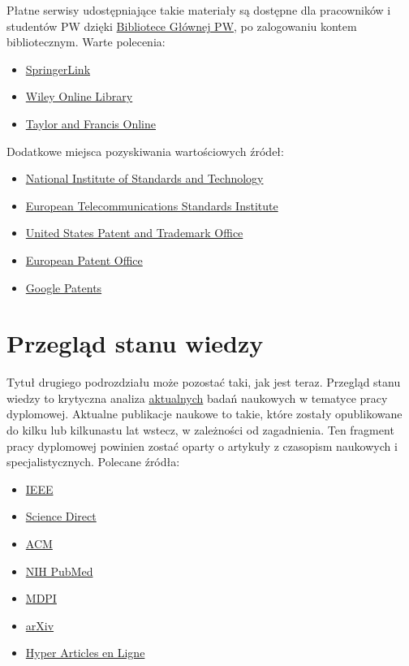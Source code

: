 Płatne serwisy udostępniające takie materiały są dostępne dla pracowników i studentów PW dzięki \href{https://bg.pw.edu.pl/}{Bibliotece Głównej PW}, po zalogowaniu kontem bibliotecznym. Warte polecenia:

\begin{itemize}
	\item \href{http://eczyt.bg.pw.edu.pl/han/SpringerLink}{SpringerLink}
	\item \href{http://eczyt.bg.pw.edu.pl/han/Wiley}{Wiley Online Library}
	\item \href{http://eczyt.bg.pw.edu.pl/han/TaylorandFrancis}{Taylor and Francis Online}
\end{itemize}

Dodatkowe miejsca pozyskiwania wartościowych źródeł:

\begin{itemize}
	\item \href{https://www.nist.gov/}{National Institute of Standards and Technology}
	\item \href{https://www.etsi.org/}{European Telecommunications Standards Institute}
	\item \href{https://www.uspto.gov/}{United States Patent and Trademark Office}
	\item \href{https://www.epo.org/en}{European Patent Office}
	\item \href{https://patents.google.com/}{Google Patents}
\end{itemize}

\section{Przegląd stanu wiedzy}

Tytuł drugiego podrozdziału może pozostać taki, jak jest teraz. Przegląd stanu wiedzy to krytyczna analiza \underline{aktualnych} badań naukowych w tematyce pracy dyplomowej. Aktualne publikacje naukowe to takie, które zostały opublikowane do kilku lub kilkunastu lat wstecz, w zależności od zagadnienia. Ten fragment pracy dyplomowej powinien zostać oparty o artykuły z czasopism naukowych i specjalistycznych. Polecane źródła:

\begin{itemize}
	\item \href{http://eczyt.bg.pw.edu.pl/han/ieee-import/}{IEEE}
	\item \href{http://eczyt.bg.pw.edu.pl/han/ScienceDirectOnLine}{Science Direct}
	\item \href{http://eczyt.bg.pw.edu.pl/han/ACMDigitalLibrary}{ACM}
	\item \href{https://pubmed.ncbi.nlm.nih.gov/}{NIH PubMed}
	\item \href{https://www.mdpi.com/}{MDPI}
	\item \href{https://arxiv.org/}{arXiv}
	\item \href{https://hal.science/}{Hyper Articles en Ligne}
\end{itemize}

